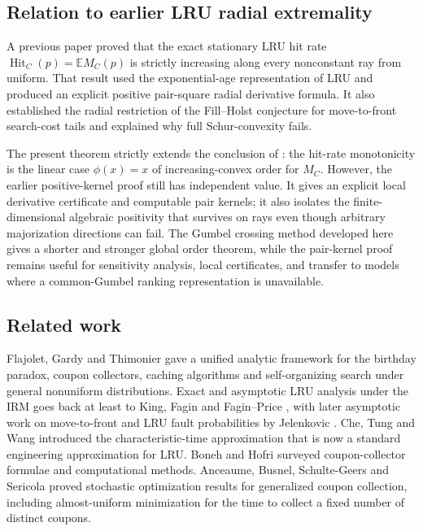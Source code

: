 \documentclass[11pt]{article}
\newcommand{\E}{\mathbb E}
\newcommand{\1}{\mathbf 1}
\newcommand{\Hit}{\operatorname{Hit}}
\begin{document}
\subsection*{Relation to earlier LRU radial extremality}

A previous paper \cite{LongLRU2026} proved that the exact stationary LRU hit rate
$\Hit_C(p)=\E M_C(p)$ is strictly increasing along every nonconstant ray from uniform.
That result used the exponential-age representation of LRU and produced an explicit
positive pair-square radial derivative formula.  It also established the radial
restriction of the Fill--Holst conjecture for move-to-front search-cost tails and
explained why full Schur-convexity fails.

The present theorem strictly extends the conclusion of \cite{LongLRU2026}: the hit-rate
monotonicity is the linear case $\phi(x)=x$ of increasing-convex order for $M_C$.
However, the earlier positive-kernel proof still has independent value.  It gives an
explicit local derivative certificate and computable pair kernels; it also isolates the
finite-dimensional algebraic positivity that survives on rays even though arbitrary
majorization directions can fail.  The Gumbel crossing method developed here gives a
shorter and stronger global order theorem, while the pair-kernel proof remains useful for
sensitivity analysis, local certificates, and transfer to models where a common-Gumbel
ranking representation is unavailable.

\subsection*{Related work}

Flajolet, Gardy and Thimonier \cite{FlajoletGardyThimonier1992} gave a unified analytic
framework for the birthday paradox, coupon collectors, caching algorithms and
self-organizing search under general nonuniform distributions.  Exact and asymptotic LRU
analysis under the IRM goes back at least to King, Fagin and Fagin--Price
\cite{King1971,Fagin1977,FaginPrice1978}, with later asymptotic work on move-to-front
and LRU fault probabilities by Jelenkovic \cite{Jelenkovic1999}.  Che, Tung and Wang
\cite{CheTungWang2002} introduced the characteristic-time approximation that is now a
standard engineering approximation for LRU.  Boneh and Hofri \cite{BonehHofri1997}
surveyed coupon-collector formulae and computational methods.  Anceaume, Busnel,
Schulte-Geers and Sericola \cite{AnceaumeBusnelSericola2016} proved stochastic
optimization results for generalized coupon collection, including almost-uniform
minimization for the time to collect a fixed number of distinct coupons.
\end{document}
